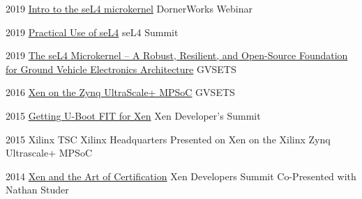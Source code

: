 \documentclass[a4paper]{cv-friggeri-x}
\begin{document}
\begin{entrylist}


\entry
{2019}
{\href{https://youtu.be/gBIRDBekQP4}{Intro to the seL4 microkernel}}
{DornerWorks}
{Webinar}


\entry
{2019}
{\href{vhttps://www.sel4-us.org/summit/presentations/Session_2_Talk_3_VanVossen_Practical_Use_of_seL4.pdf}{Practical Use of seL4}}
{seL4 Summit}
{}


\entry
{2019}
{\href{http://gvsets.ndia-mich.org/publication.php?documentID=765}{The seL4 Microkernel – A Robust, Resilient, and Open-Source Foundation for Ground Vehicle Electronics Architecture}}
{GVSETS}
{}


\entry
{2016}
{\href{http://gvsets.ndia-mich.org/publication.php?documentID=60}{Xen on the Zynq UltraScale+ MPSoC}}
{GVSETS}
{}


\entry
{2015}
{\href{https://youtu.be/arNnhfXYCkM}{Getting U-Boot FIT for Xen}}
{Xen Developer’s Summit}
{}


\entry
{2015}
{Xilinx TSC}
{Xilinx Headquarters}
{Presented on Xen on the Xilinx Zynq Ultrascale+ MPSoC}


\entry
{2014}
{\href{https://www.slideshare.net/xen_com_mgr/art-certification}{Xen and the Art of Certification}}
{Xen Developers Summit}
{Co-Presented with Nathan Studer}


\end{entrylist}


%
%
%
%
%
%
%
\end{document}
